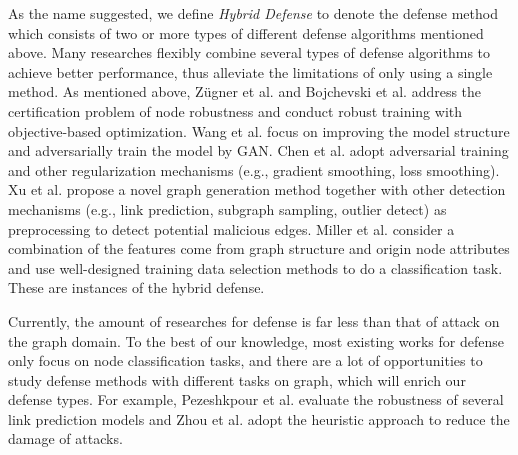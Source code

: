  As the name suggested, we define \emph{Hybrid Defense} to denote the defense method which consists of two or more types of different defense algorithms mentioned above. Many researches flexibly combine several types of defense algorithms to achieve better performance, thus alleviate the limitations of only using a single method. As mentioned above, Z\"ugner et al. \cite{zugner2019certifiable} and Bojchevski et al. \cite{bojchevski2019certifiable} address the certification problem of node robustness and conduct robust training with objective-based optimization. Wang et al. \cite{wang2019adversarial} focus on improving the model structure and adversarially train the model by GAN. Chen et al. \cite{chen2019can} adopt adversarial training and other regularization mechanisms (e.g., gradient smoothing, loss smoothing). Xu et al. \cite{xu2018characterizing} propose a novel graph generation method together with other detection mechanisms (e.g., link prediction, subgraph sampling, outlier detect) as preprocessing to detect potential malicious edges. Miller et al. \cite{miller2019improving} consider a combination of the features come from graph structure and origin node attributes and use well-designed training data selection methods to do a classification task. These are instances of the hybrid defense.

 Currently, the amount of researches for defense is far less than that of attack on the graph domain. To the best of our knowledge, most existing works for defense only focus on node classification tasks, and there are a lot of opportunities to study defense methods with different tasks on graph, which will enrich our defense types. For example, Pezeshkpour et al. \cite{pezeshkpour2019investigating} evaluate the robustness of several link prediction models and Zhou et al. \cite{zhou2019adversarial} adopt the heuristic approach to reduce the damage of attacks.


